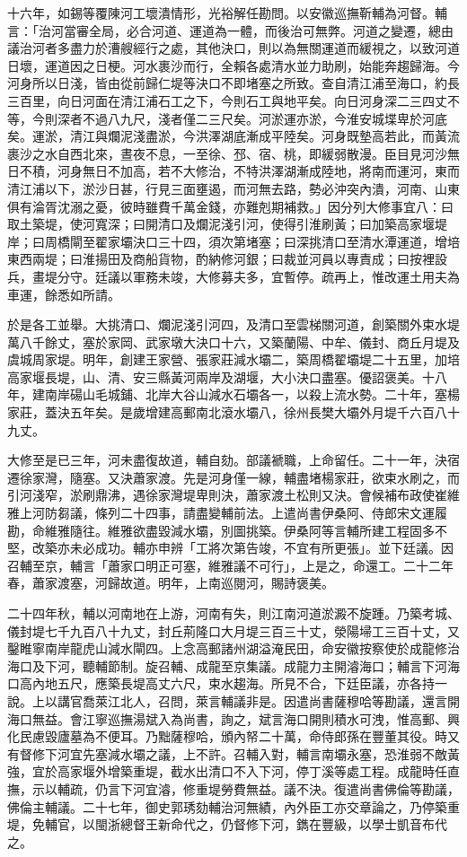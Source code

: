 \begin{pinyinscope}
十六年，如錫等覆陳河工壞潰情形，光裕解任勘問。以安徽巡撫靳輔為河督。輔言：「治河當審全局，必合河道、運道為一體，而後治可無弊。河道之變遷，總由議治河者多盡力於漕艘經行之處，其他決口，則以為無關運道而緩視之，以致河道日壞，運道因之日梗。河水裹沙而行，全賴各處清水並力助刷，始能奔趨歸海。今河身所以日淺，皆由從前歸仁堤等決口不即堵塞之所致。查自清江浦至海口，約長三百里，向日河面在清江浦石工之下，今則石工與地平矣。向日河身深二三四丈不等，今則深者不過八九尺，淺者僅二三尺矣。河淤運亦淤，今淮安城堞卑於河底矣。運淤，清江與爛泥淺盡淤，今洪澤湖底漸成平陸矣。河身既墊高若此，而黃流裹沙之水自西北來，晝夜不息，一至徐、邳、宿、桃，即緩弱散漫。臣目見河沙無日不積，河身無日不加高，若不大修治，不特洪澤湖漸成陸地，將南而運河，東而清江浦以下，淤沙日甚，行見三面壅遏，而河無去路，勢必沖突內潰，河南、山東俱有淪胥沈溺之憂，彼時雖費千萬金錢，亦難剋期補救。」因分列大修事宜八：曰取土築堤，使河寬深；曰開清口及爛泥淺引河，使得引淮刷黃；曰加築高家堰堤岸；曰周橋閘至翟家壩決口三十四，須次第堵塞；曰深挑清口至清水潭運道，增培東西兩堤；曰淮揚田及商船貨物，酌納修河銀；曰裁並河員以專責成；曰按裡設兵，畫堤分守。廷議以軍務未竣，大修募夫多，宜暫停。疏再上，惟改運土用夫為車運，餘悉如所請。

於是各工並舉。大挑清口、爛泥淺引河四，及清口至雲梯關河道，創築關外束水堤萬八千餘丈，塞於家岡、武家墩大決口十六，又築蘭陽、中牟、儀封、商丘月堤及虞城周家堤。明年，創建王家營、張家莊減水壩二，築周橋翟壩堤二十五里，加培高家堰長堤，山、清、安三縣黃河兩岸及湖堰，大小決口盡塞。優詔褒美。十八年，建南岸碭山毛城鋪、北岸大谷山減水石壩各一，以殺上流水勢。二十年，塞楊家莊，蓋決五年矣。是歲增建高郵南北滾水壩八，徐州長樊大壩外月堤千六百八十九丈。

大修至是已三年，河未盡復故道，輔自劾。部議褫職，上命留任。二十一年，決宿遷徐家灣，隨塞。又決蕭家渡。先是河身僅一線，輔盡堵楊家莊，欲束水刷之，而引河淺窄，淤刷鼎沸，遇徐家灣堤卑則決，蕭家渡土松則又決。會候補布政使崔維雅上河防芻議，條列二十四事，請盡變輔前法。上遣尚書伊桑阿、侍郎宋文運履勘，命維雅隨往。維雅欲盡毀減水壩，別圖挑築。伊桑阿等言輔所建工程固多不堅，改築亦未必成功。輔亦申辨「工將次第告竣，不宜有所更張」。並下廷議。因召輔至京，輔言「蕭家口明正可塞，維雅議不可行」，上是之，命還工。二十二年春，蕭家渡塞，河歸故道。明年，上南巡閱河，賜詩褒美。

二十四年秋，輔以河南地在上游，河南有失，則江南河道淤澱不旋踵。乃築考城、儀封堤七千九百八十九丈，封丘荊隆口大月堤三百三十丈，滎陽埽工三百十丈，又鑿睢寧南岸龍虎山減水閘四。上念高郵諸州湖溢淹民田，命安徽按察使於成龍修治海口及下河，聽輔節制。旋召輔、成龍至京集議。成龍力主開濬海口；輔言下河海口高內地五尺，應築長堤高丈六尺，束水趨海。所見不合，下廷臣議，亦各持一說。上以講官喬萊江北人，召問，萊言輔議非是。因遣尚書薩穆哈等勘議，還言開海口無益。會江寧巡撫湯斌入為尚書，詢之，斌言海口開則積水可洩，惟高郵、興化民慮毀廬墓為不便耳。乃黜薩穆哈，頒內帑二十萬，命侍郎孫在豐董其役。時又有督修下河宜先塞減水壩之議，上不許。召輔入對，輔言南壩永塞，恐淮弱不敵黃強，宜於高家堰外增築重堤，截水出清口不入下河，停丁溪等處工程。成龍時任直撫，示以輔疏，仍言下河宜濬，修重堤勞費無益。議不決。復遣尚書佛倫等勘議，佛倫主輔議。二十七年，御史郭琇劾輔治河無績，內外臣工亦交章論之，乃停築重堤，免輔官，以閩浙總督王新命代之，仍督修下河，鐫在豐級，以學士凱音布代之。


\end{pinyinscope}
